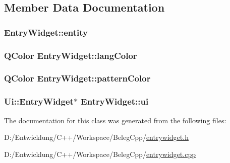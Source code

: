 \subsection{Member Data Documentation}
\hypertarget{class_entry_widget_af215e0236b2829209fc5959185e4e294}{
\subsubsection[{entity}]{ Entry\+Widget\+::entity\hspace{0.3cm}{\ttfamily [private]}}}\label{class_entry_widget_af215e0236b2829209fc5959185e4e294}
\hypertarget{class_entry_widget_a6526e1c4616131455687396ffb04d5c0}{
\subsubsection[{lang\+Color}]{\setlength{\rightskip}{0pt plus 5cm}Q\+Color Entry\+Widget\+::lang\+Color\hspace{0.3cm}{\ttfamily [private]}}}\label{class_entry_widget_a6526e1c4616131455687396ffb04d5c0}
\hypertarget{class_entry_widget_aaac389b8064da69a2b02d63c9539f698}{
\subsubsection[{pattern\+Color}]{\setlength{\rightskip}{0pt plus 5cm}Q\+Color Entry\+Widget\+::pattern\+Color\hspace{0.3cm}{\ttfamily [private]}}}\label{class_entry_widget_aaac389b8064da69a2b02d63c9539f698}
\hypertarget{class_entry_widget_a2bba2d44d055b69a06391def732e6141}{
\subsubsection[{ui}]{\setlength{\rightskip}{0pt plus 5cm}Ui\+::\+Entry\+Widget$\ast$ Entry\+Widget\+::ui\hspace{0.3cm}{\ttfamily [private]}}}\label{class_entry_widget_a2bba2d44d055b69a06391def732e6141}


The documentation for this class was generated from the following files\+:\begin{DoxyCompactItemize}
\item 
D\+:/\+Entwicklung/\+C++/\+Workspace/\+Beleg\+Cpp/\hyperlink{entrywidget_8h}{entrywidget.\+h}\item 
D\+:/\+Entwicklung/\+C++/\+Workspace/\+Beleg\+Cpp/\hyperlink{entrywidget_8cpp}{entrywidget.\+cpp}\end{DoxyCompactItemize}
